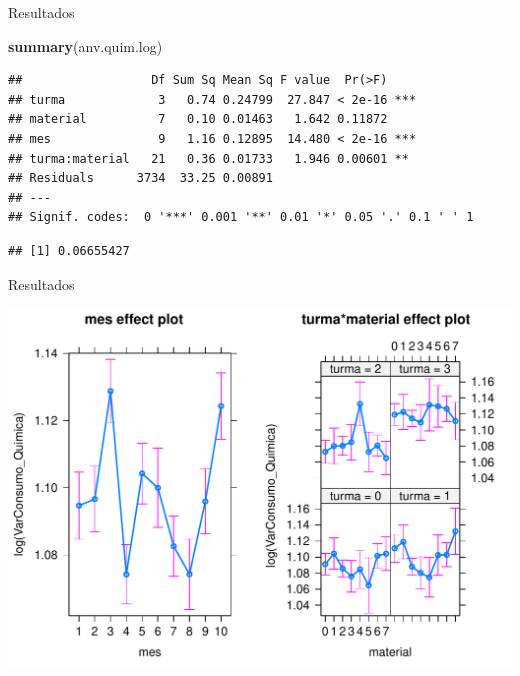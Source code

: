 \documentclass[
  ignorenonframetext,
]{beamer}
\newenvironment{Shaded}{\begin{snugshade}}{\end{snugshade}}
\newcommand{\KeywordTok}[1]{\textcolor[rgb]{0.13,0.29,0.53}{\textbf{#1}}}
\newcommand{\NormalTok}[1]{#1}
\newcommand{\OperatorTok}[1]{\textcolor[rgb]{0.81,0.36,0.00}{\textbf{#1}}}
\begin{document}
\begin{frame}[fragile]{Resultados}
\protect\hypertarget{resultados}{}

\begin{Shaded}
\begin{Highlighting}[]
\KeywordTok{summary}\NormalTok{(anv.quim.log)}
\end{Highlighting}
\end{Shaded}

\begin{verbatim}
##                  Df Sum Sq Mean Sq F value  Pr(>F)    
## turma             3   0.74 0.24799  27.847 < 2e-16 ***
## material          7   0.10 0.01463   1.642 0.11872    
## mes               9   1.16 0.12895  14.480 < 2e-16 ***
## turma:material   21   0.36 0.01733   1.946 0.00601 ** 
## Residuals      3734  33.25 0.00891                    
## ---
## Signif. codes:  0 '***' 0.001 '**' 0.01 '*' 0.05 '.' 0.1 ' ' 1
\end{verbatim}

\begin{Shaded}
\end{Shaded}

\begin{verbatim}
## [1] 0.06655427
\end{verbatim}

\end{frame}

\begin{frame}{Resultados}
\protect\hypertarget{resultados-1}{}

\begin{center}\includegraphics{apresentacao_final_files/figure-beamer/effects_plot_o2-1} \end{center}

\end{frame}
\end{document}
